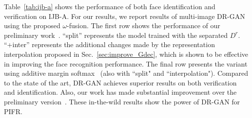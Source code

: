 \documentclass[10pt,journal,compsoc]{IEEEtran}
\begin{document}
Table~\ref{tab:ijb-a} shows the performance of both face identification and verification on IJB-A.
For our results, we report results of multi-image DR-GAN using the proposed $\omega$-fusion.
%
The first row shows the performance of our preliminary work~\cite{tran2017disentangled}.
%
``split'' represents the model trained with the separated $D^r$.
%
``+inter'' represents the additional changes made by the representation interpolation proposed in Sec.~\ref{sec:improve_Gdec}, which is shown to be effective in improving the face recognition performance. 
The final row presents the variant using additive margin softmax~\cite{wang2018additive} (also with ``split" and ``interpolation"). 
Compared to the state of the art, DR-GAN achieves superior results on both verification and identification. 
Also, our work has made substantial improvement over the preliminary version~\cite{tran2017disentangled}. 
These in-the-wild results show the power of DR-GAN for PIFR.
\end{document}
